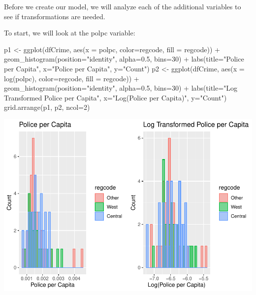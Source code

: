 \documentclass[]{article}
\newenvironment{Shaded}{}{}
\newcommand{\DataTypeTok}[1]{#1}
\newcommand{\DecValTok}[1]{#1}
\newcommand{\FloatTok}[1]{#1}
\newcommand{\KeywordTok}[1]{\textcolor[rgb]{0.00,0.00,1.00}{#1}}
\newcommand{\NormalTok}[1]{#1}
\newcommand{\OperatorTok}[1]{#1}
\newcommand{\StringTok}[1]{\textcolor[rgb]{0.00,0.50,0.50}{#1}}
\begin{document}
Before we create our model, we will analyze each of the additional
variables to see if transformations are needed.

To start, we will look at the polpc variable:

\begin{Shaded}
\begin{Highlighting}[]
\NormalTok{p1 <-}\StringTok{ }\KeywordTok{ggplot}\NormalTok{(dfCrime, }\KeywordTok{aes}\NormalTok{(}\DataTypeTok{x =}\NormalTok{ polpc, }\DataTypeTok{color=}\NormalTok{regcode, }\DataTypeTok{fill =}\NormalTok{ regcode)) }\OperatorTok{+}\StringTok{ }
\StringTok{  }\KeywordTok{geom_histogram}\NormalTok{(}\DataTypeTok{position=}\StringTok{"identity"}\NormalTok{, }\DataTypeTok{alpha=}\FloatTok{0.5}\NormalTok{, }\DataTypeTok{bins=}\DecValTok{30}\NormalTok{) }\OperatorTok{+}
\StringTok{  }\KeywordTok{labs}\NormalTok{(}\DataTypeTok{title=}\StringTok{"Police per Capita"}\NormalTok{, }\DataTypeTok{x=}\StringTok{"Police per Capita"}\NormalTok{, }\DataTypeTok{y=}\StringTok{"Count"}\NormalTok{)}
\NormalTok{p2 <-}\StringTok{ }\KeywordTok{ggplot}\NormalTok{(dfCrime, }\KeywordTok{aes}\NormalTok{(}\DataTypeTok{x =} \KeywordTok{log}\NormalTok{(polpc), }\DataTypeTok{color=}\NormalTok{regcode, }\DataTypeTok{fill =}\NormalTok{ regcode)) }\OperatorTok{+}\StringTok{ }
\StringTok{  }\KeywordTok{geom_histogram}\NormalTok{(}\DataTypeTok{position=}\StringTok{"identity"}\NormalTok{, }\DataTypeTok{alpha=}\FloatTok{0.5}\NormalTok{, }\DataTypeTok{bins=}\DecValTok{30}\NormalTok{) }\OperatorTok{+}
\StringTok{  }\KeywordTok{labs}\NormalTok{(}\DataTypeTok{title=}\StringTok{"Log Transformed Police per Capita"}\NormalTok{, }\DataTypeTok{x=}\StringTok{"Log(Police per Capita)"}\NormalTok{, }\DataTypeTok{y=}\StringTok{"Count"}\NormalTok{)}
\KeywordTok{grid.arrange}\NormalTok{(p1, p2, }\DataTypeTok{ncol=}\DecValTok{2}\NormalTok{)}
\end{Highlighting}
\end{Shaded}

\includegraphics{Bagnard_Gaustad_Hartman_Leung_Lab_3_files/figure-latex/unnamed-chunk-66-1.pdf}
\end{document}
